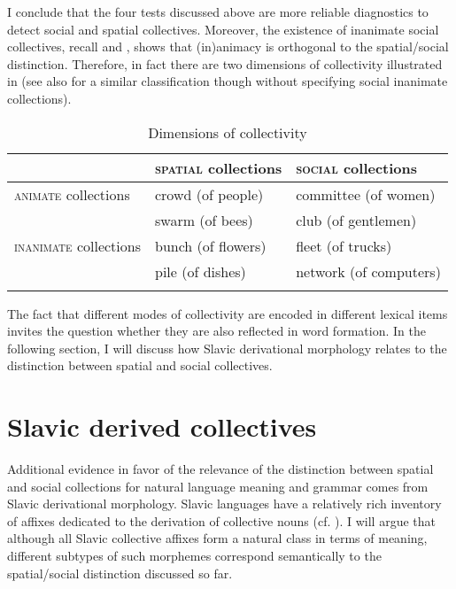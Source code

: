 \documentclass[output=paper]{langscibook}
\begin{document}
\noindent I conclude that the four tests discussed above are more reliable diagnostics to detect social and spatial collectives. Moreover, the existence of inanimate social collectives, recall  and , shows that (in)animacy is orthogonal to the spatial/social distinction. Therefore, in fact there are two dimensions of collectivity illustrated in  (see also \citealt{zwarts2020contiguity} for a similar classification though without specifying social inanimate collections).

\begin{table}[h!]
\centering
	\caption{Dimensions of collectivity} 
	\label{wan:tab:dimensions-of-collectivity}
	\begin{tabular}{lll} 
		\lsptoprule
		& \textsc{spatial} collections & \textsc{social} collections \\ 
		\midrule
		\textsc{animate} collections  &   crowd (of people) 
		&    committee (of women) 
		\\
		& swarm (of bees) & club (of gentlemen) \\ \tablevspace
		\textsc{inanimate} collections  &   bunch (of flowers) 
		&   fleet (of trucks)  \\
		& pile (of dishes) & network (of computers)\\
		\lspbottomrule
	\end{tabular}
\end{table}

The fact that different modes of collectivity are encoded in different lexical items invites the question whether they are also reflected in word formation. In the following section, I will discuss how Slavic derivational morphology relates to the distinction between spatial and social collectives.

\section{Slavic derived collectives}\label{wan:sec:slavic-derived-collectives}

Additional evidence in favor of the relevance of the distinction between spatial and social collections for natural language meaning and grammar comes from Slavic derivational morphology. Slavic languages have a relatively rich inventory of affixes dedicated to the derivation of collective nouns (cf. \citealt{mozdzierz1994forms,ojeda_grivicic2005semantics,mitrovic2011count,tomic2012grammar,arsenijevic2017gender,grimm_docekal-toappear-counting}). I will argue that although all Slavic collective affixes form a natural class in terms of meaning, different subtypes of such morphemes correspond semantically to the spatial/social distinction discussed so far.
\end{document}
